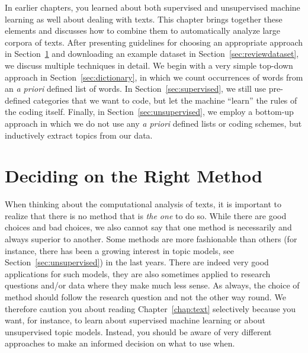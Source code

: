 In earlier chapters, you learned about both supervised and unsupervised machine learning as well about dealing with texts.
This chapter brings together these elements and discusses how to combine them to automatically analyze large corpora of texts. After presenting guidelines for choosing an appropriate approach in Section~\ref{sec:deciding} and downloading an example dataset in Section~\ref{sec:reviewdataset}, we discuss multiple techniques in detail.
We begin with a very simple top-down approach in Section~\ref{sec:dictionary}, in which we count occurrences of words from an \emph{a priori} defined list of words. In Section~\ref{sec:supervised}, we still use pre-defined categories that we want to code, but let the machine ``learn'' the rules of the coding itself. Finally, in Section~\ref{sec:unsupervised}, we employ a bottom-up approach in which we do not use any \emph{a priori} defined lists or coding schemes, but inductively extract topics from our data.

%

\section{Deciding on the Right Method}
\label{sec:deciding}

When thinking about the computational analysis of texts, it is
important to realize that there is no method that is \emph{the one}  to do
so. While there are good choices and bad choices, we also cannot say
that one method is necessarily and always superior to another. Some
methods are more fashionable than others (for instance, there has been
a growing interest in topic models, see Section~\ref{sec:unsupervised}) in the
last years. There are indeed very good applications for such models,
they are also sometimes applied to research questions and/or data
where they make much less sense.  As always, the choice of method
should follow the research question and not the other way round. We
therefore caution you about reading Chapter~\ref{chap:text} selectively because you
want, for instance, to learn about supervised machine learning or about
unsupervised topic models. Instead, you should be aware of very
different approaches to make an informed decision on what to use when.

